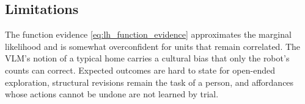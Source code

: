 \subsection{Limitations}
\label{sec:lang_hierarchy:limitations}

The function evidence \eqref{eq:lh_function_evidence} approximates the marginal likelihood and is somewhat
overconfident for units that remain correlated. The VLM's notion of a typical home carries a cultural bias that only
the robot's counts can correct. Expected outcomes are hard to state for open-ended exploration, structural
revisions remain the task of a person, and affordances whose actions cannot be undone are not learned by trial.
